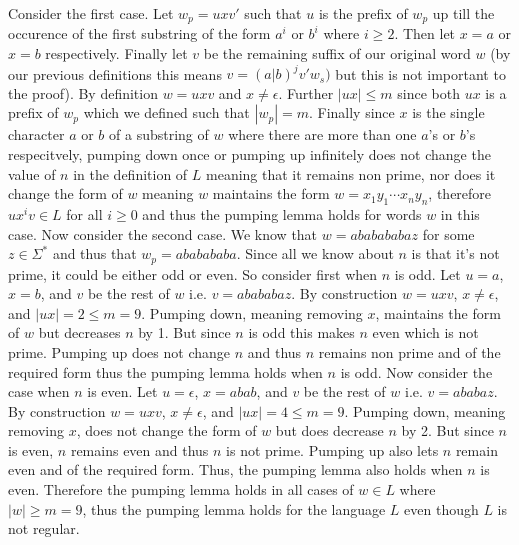 \documentclass[12pt]{article}
\begin{document}
Consider the first case. Let $w_p = uxv'$ such that $u$ is the prefix of
$w_p$ up till the occurence of the first substring of the form $a^i$ or $b^i$
where $i \ge 2$. Then let $x = a$ or $x = b$ respectively. Finally let $v$ be
the remaining suffix of our original word $w$ (by our previous definitions this
means $v = (a | b)^jv'w_s)$ but this is not important to the proof).
By definition $w = uxv$ and $x \neq \epsilon$. Further $|ux| \le m$ since both
$ux$ is a prefix of $w_p$ which we defined such that $|w_p| = m$. Finally since
$x$ is the single character $a$ or $b$ of a substring of $w$ where there are
more than one $a$'s or $b$'s respecitvely, pumping down once or pumping up
infinitely does not change the value of $n$ in the definition of $L$ meaning
that it remains non prime, nor does it change the form of $w$ meaning $w$
maintains the form $w = x_1y_1 \cdots x_ny_n$, therefore $ux^iv \in L$ for all
$i \ge 0$ and thus the pumping lemma holds for words $w$ in this case.
\medskip
\newline
Now consider the second case. We know that $w = ababababaz$ for some
$z \in \Sigma^*$ and thus that $w_p = ababababa$. Since all we know about $n$ is
that it's not prime, it could be either odd or even. So consider first when $n$
is odd. Let $u = a$, $x = b$, and $v$ be the rest of $w$ i.e. $v = abababaz$. By
construction $w = uxv$, $x \neq \epsilon$, and $|ux| = 2 \le m = 9$. Pumping
down, meaning removing $x$, maintains the form of $w$ but decreases $n$ by 1.
But since $n$ is odd this makes $n$ even which is not prime. Pumping up does
not change $n$ and thus $n$ remains non prime and of the required form
thus the pumping lemma holds when $n$ is odd. Now consider the case when $n$ is
even. Let $u = \epsilon$, $x = abab$, and $v$ be the rest of $w$ i.e.
$v = ababaz$. By construction $w = uxv$, $x \neq \epsilon$, and
$|ux| = 4 \le m = 9$. Pumping down, meaning removing $x$, does not change the
form of $w$ but does decrease $n$ by 2. But since $n$ is even, $n$ remains even
and thus $n$ is not prime. Pumping up also lets $n$ remain even and of the
required form. Thus, the pumping lemma also holds when $n$ is even.
\medskip
\newline
Therefore the pumping lemma holds in all cases of $w \in L$ where $|w| \ge m = 9$,
thus the pumping lemma holds for the language $L$ even though $L$ is not regular.
\end{document}
